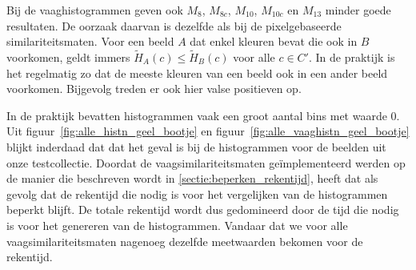 Bij de vaaghistogrammen geven ook $M_8$, $M_{8c}$, $M_{10}$, $M_{10c}$ en $M_{13}$ minder goede resultaten.
De oorzaak daarvan is dezelfde als bij de pixelgebaseerde similariteitsmaten. Voor een beeld $A$ dat enkel
kleuren bevat die ook in $B$ voorkomen, geldt immers $\widetilde{H}_A(c) \leq \widetilde{H}_B(c)$ voor 
alle $c \in C'$. In de praktijk is het regelmatig zo dat de meeste kleuren van een beeld ook in een
ander beeld voorkomen. Bijgevolg treden er ook hier valse positieven op.

In de praktijk bevatten histogrammen vaak een groot aantal bins met waarde $0$. Uit 
figuur~\ref{fig:alle_histn_geel_bootje} en figuur~\ref{fig:alle_vaaghistn_geel_bootje} blijkt 
inderdaad dat dat het geval is bij de histogrammen voor de beelden uit onze testcollectie. 
Doordat de vaagsimilariteitsmaten ge\"implementeerd werden op de manier die beschreven wordt in 
\ref{sectie:beperken_rekentijd}, heeft dat als gevolg dat de rekentijd die nodig is voor het 
vergelijken van de histogrammen beperkt blijft. De totale rekentijd wordt dus gedomineerd door 
de tijd die nodig is voor het genereren van de histogrammen. Vandaar dat we voor alle 
vaagsimilariteitsmaten nagenoeg dezelfde meetwaarden bekomen voor de rekentijd. 

